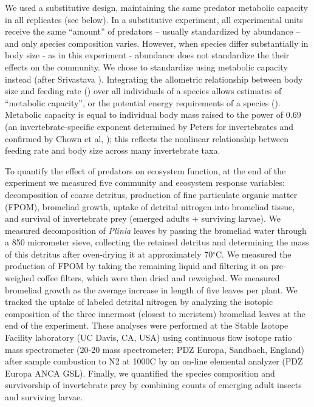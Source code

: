 \documentclass[11pt]{article}
\begin{document}
We used a substitutive design, maintaining the same predator metabolic
capacity in all replicates (see below). In a substitutive experiment,
all experimental units receive the same ``amount'' of predators --
usually standardized by abundance -- and only species composition
varies. However, when species differ substantially in body size - as in
this experiment - abundance does not standardize the their effects on
the community. We chose to standardize using metabolic capacity instead
(after Srivastava \citeyearpar{Srivastava2009a}). Integrating the
allometric relationship between body size and feeding rate
(\citealt{Brown2004, Wilby2005}) over all individuals of a species allows
estimates of ``metabolic capacity'', or the potential energy
requirements of a species (\citealt{Srivastava2009a}). Metabolic capacity is
equal to individual body mass raised to the power of 0.69 (an
invertebrate-specific exponent determined by Peters
\citeyearpar{Peters1986} for invertebrates and confirmed by Chown et al,
\citeyearpar{Chown2007}); this reflects the nonlinear relationship
between feeding rate and body size across many invertebrate taxa.

To quantify the effect of predators on ecosystem function, at the end of
the experiment we measured five community and ecosystem response
variables: decomposition of coarse detritus, production of fine
particulate organic matter (FPOM), bromeliad growth, uptake of detrital
nitrogen into bromeliad tissue, and survival of invertebrate prey
(emerged adults + surviving larvae). We measured decomposition of \emph{Plinia} leaves by passing the bromeliad water through a 850 micrometer sieve, collecting the
retained detritus and determining the mass of this detritus after
oven-drying it at approximately 70\(^\circ\)C. We measured the
production of FPOM by taking the remaining liquid and filtering it on
pre-weighed coffee filters, which were then dried and reweighed. We
measured bromeliad growth as the average increase in length of five
leaves per plant. We tracked the uptake of labeled detrital nitrogen by
analyzing the isotopic composition of the three innermost (closest to meristem) bromeliad leaves at the
end of the experiment. These analyses
 were performed at the Stable Isotope Facility laboratory (UC Davis, CA, USA) using continuous
flow isotope ratio mass spectrometer (20-20 mass spectrometer; PDZ Europa, Sandbach, England)
after sample combustion to N2 at 1000C by an on-line elemental analyzer (PDZ Europa ANCA
GSL). Finally, we quantified the species composition
and survivorship of invertebrate prey by combining counts of emerging
adult insects and surviving larvae.
\end{document}
